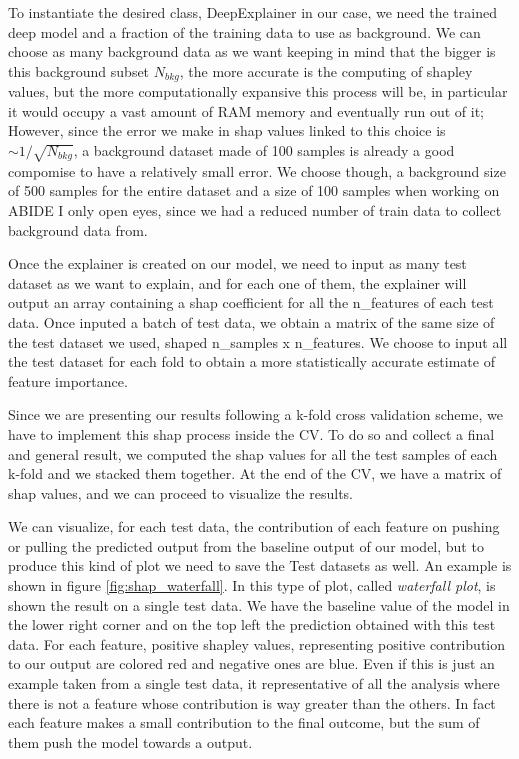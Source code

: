\documentclass[10pt]{report}
\begin{document}
To instantiate the desired class, DeepExplainer in our case, we need the trained deep model and a fraction of the training data to use as background. We can choose as many background data as we want keeping in mind that the bigger is this background subset $N_{bkg}$, the more accurate is the computing of shapley values, but the more computationally expansive this process will be, in particular it would occupy a vast amount of RAM memory and eventually run out of it;
However, since the error we make in shap values linked to this choice is $\sim 1/\sqrt{N_{bkg}}$, a background dataset made of 100 samples is already a good compomise to have a relatively small error.
We choose though, a background size of 500 samples for the entire dataset and a size of 100 samples when working on ABIDE I only open eyes, since we had a reduced number of train data to collect background data from.

Once the explainer is created on our model, we need to input as many test dataset as we want to explain, and for each one of them, the explainer will output an array containing a shap coefficient for all the n\_features of each test data.
Once inputed a batch of test data, we obtain a matrix of the same size of the test dataset we used, shaped n\_samples x n\_features.
We choose to input all the test dataset for each fold to obtain a more statistically accurate estimate of feature importance.

Since we are presenting our results following a k-fold cross validation scheme, we have to implement this shap process inside the CV.
To do so and collect a final and general result, we computed the shap values for all the test samples of each k-fold and we stacked them together.
At the end of the CV, we have a matrix of shap values, and we can proceed to visualize the results.

\hfill

We can visualize, for each test data, the contribution of each feature on pushing or pulling the predicted output from the baseline output of our model, but to produce this kind of plot we need to save the Test datasets as well.
An example is shown in figure \ref{fig:shap_waterfall}.
In this type of plot, called \emph{waterfall plot}, is shown the result on a single test data. We have the baseline value of the model in the lower right corner and on the top left the prediction obtained with this test data. For each feature, positive shapley values, representing positive contribution to our output are colored red and negative ones are blue.
Even if this is just an example taken from a single test data, it representative of all the analysis where there is not a feature whose contribution is way greater than the others. In fact each feature makes a small contribution to the final outcome, but the sum of them push the model towards a output.
\end{document}
